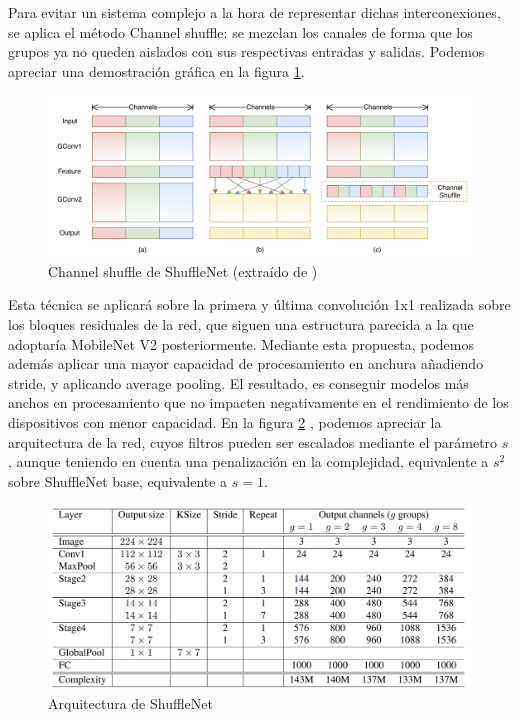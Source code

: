 Para evitar un sistema complejo a la hora de representar dichas interconexiones, se aplica el método Channel shuffle: se mezclan los canales de forma que los grupos ya no queden aislados con sus respectivas entradas y salidas. Podemos apreciar una demostración gráfica en la figura \ref{shufflechannels}.

    \begin{figure}[H]

	\centering
	\includegraphics[scale = 0.2]{imagenes/shufflechannels.png}
	\caption{Channel shuffle de ShuffleNet (extraído de \cite{zhang2017shufflenet})}
	\label{shufflechannels}
\end{figure}

Esta técnica se aplicará sobre la primera y última convolución 1x1 realizada sobre los bloques residuales de la red, que siguen una estructura parecida a la que adoptaría MobileNet V2 posteriormente. Mediante esta propuesta, podemos además aplicar una mayor capacidad de procesamiento en anchura añadiendo stride, y aplicando average pooling. El resultado, es conseguir modelos más anchos en procesamiento que no impacten negativamente en el rendimiento de los dispositivos con menor capacidad. En la figura \ref{arquitecturashuffle} , podemos apreciar la arquitectura de la red, cuyos filtros pueden ser escalados mediante el parámetro $s$, aunque teniendo en cuenta una penalización en la complejidad, equivalente a $s^2$ sobre ShuffleNet base, equivalente a $s=1$.

\begin{figure}[H]

		\centering
		\includegraphics[scale = 0.2]{imagenes/arquitecturashuffle.png}
		\caption{Arquitectura de ShuffleNet \cite{zhang2017shufflenet}}
		\label{arquitecturashuffle}
	\end{figure}

